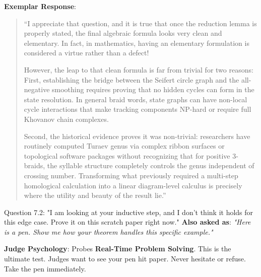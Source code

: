 \documentclass[11pt,letterpaper]{article}
\begin{document}
\begin{exemplarbox}
\textbf{Exemplar Response}:
\begin{quote}
``I appreciate that question, and it is true that once the reduction lemma is properly stated, the final algebraic formula looks very clean and elementary. In fact, in mathematics, having an elementary formulation is considered a virtue rather than a defect!

However, the leap to that clean formula is far from trivial for two reasons:
First, establishing the bridge between the Seifert circle graph and the all-negative smoothing requires proving that no hidden cycles can form in the state resolution. In general braid words, state graphs can have non-local cycle interactions that make tracking components NP-hard or require full Khovanov chain complexes. 

Second, the historical evidence proves it was non-trivial: researchers have routinely computed Turaev genus via complex ribbon surfaces or topological software packages without recognizing that for positive 3-braids, the syllable structure completely controls the genus independent of crossing number. Transforming what previously required a multi-step homological calculation into a linear diagram-level calculus is precisely where the utility and beauty of the result lie.''
\end{quote}
\end{exemplarbox}

\vspace{1em}

\begin{questionbox}{Question 7.2: "I am looking at your inductive step, and I don't think it holds for this edge case. Prove it on this scratch paper right now."}
\textbf{Also asked as}: \textit{"Here is a pen. Show me how your theorem handles this specific example."}
\end{questionbox}

\begin{strategybox}
\textbf{Judge Psychology}: Probes \textbf{Real-Time Problem Solving}. This is the ultimate test. Judges want to see your pen hit paper. Never hesitate or refuse. Take the pen immediately.
\end{strategybox}
\end{document}
